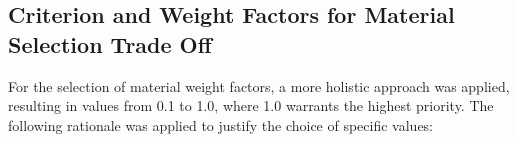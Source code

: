 \subsection{Criterion and Weight Factors for Material Selection Trade Off}
\label{sec:Mat_sel}
For the selection of material weight factors, a more holistic approach was applied, resulting in values from 0.1 to 1.0, where 1.0 warrants the highest priority. The following rationale was applied to justify the choice of specific values:

